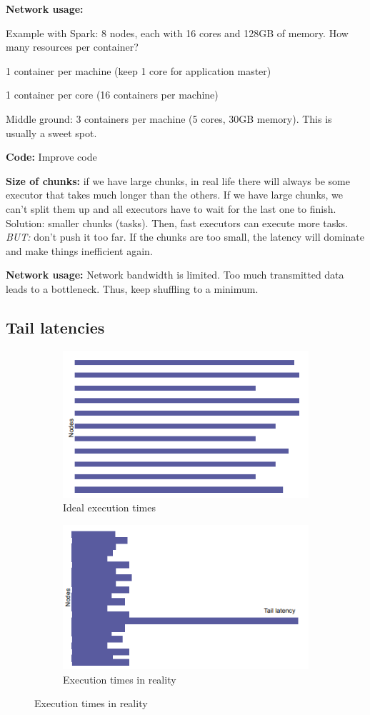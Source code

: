 \documentclass[11pt,oneside,a4paper]{article}
\begin{document}
{\textbf{Network usage:}

Example with Spark: 8 nodes, each with 16 cores and 128GB of memory. How many resources per container?

\begin{compactenum}
\item 1 container per machine (keep 1 core for application master)
\item 1 container per core (16 containers per machine)
\item Middle ground: 3 containers per machine (5 cores, 30GB memory). This is usually a sweet spot.
\end{compactenum}

\textbf{Code:} Improve code

\textbf{Size of chunks:} if we have large chunks, in real life there will always be some executor that takes much longer than the others. If we have large chunks, we can't split them up and all executors have to wait for the last one to finish. Solution: smaller chunks (tasks). Then, fast executors can execute more tasks. \textit{BUT:} don't push it too far. If the chunks are too small, the latency will dominate and make things inefficient again.


\textbf{Network usage:} Network bandwidth is limited. Too much transmitted data leads to a bottleneck. Thus, keep shuffling to a minimum.\\

\subsection{Tail latencies}

\begin{figure}[hb!]
	\centering
	\begin{subfigure}[t]{.5\textwidth}
		\centering
		\includegraphics[width=0.4\linewidth]{figures/performance_time_ideal}
		\caption{Ideal execution times}
	\end{subfigure}%
	\begin{subfigure}[t]{.5\textwidth}
		\centering
		\includegraphics[width=0.4\linewidth]{figures/performance_time_real}
		\caption{Execution times in reality}
	\end{subfigure}
\end{figure}

}
\end{document}
